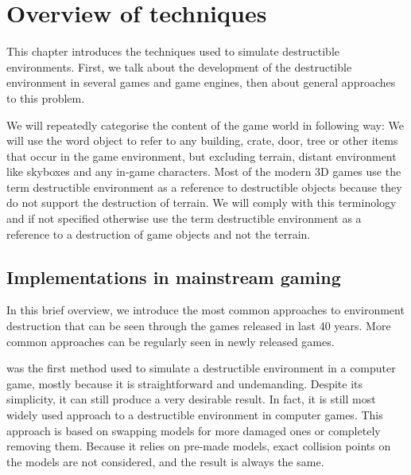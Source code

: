 \chapter{Overview of techniques}
This chapter introduces the techniques used to simulate destructible environments. First, we talk about the development of the destructible environment in several games and game engines, then about general approaches to this problem.

We will repeatedly categorise the content of the game world in following way: We will use the word object to refer to any building, crate, door, tree or other items that occur in the game environment, but excluding terrain, distant environment like skyboxes and any in-game characters. Most of the modern 3D games use the term destructible environment as a reference to destructible objects because they do not support the destruction of terrain. We will comply with this terminology and if not specified otherwise use the term destructible environment as a reference to a destruction of game objects and not the terrain.

\section{Implementations in mainstream gaming}
\label{sec:common}
In this brief overview, we introduce the most common approaches to environment destruction that can be seen through the games released in last 40 years. More common approaches can be regularly seen  in newly released games.

 was the first method used to simulate a destructible environment in a computer game, mostly because it is straightforward and undemanding. Despite its simplicity, it can still produce a very desirable result. In fact, it is still most widely used approach to a destructible environment in computer games. This approach is based on swapping models for more damaged ones or completely removing them. Because it relies on pre-made models, exact collision points on the models are not considered, and the result is always the same. 

